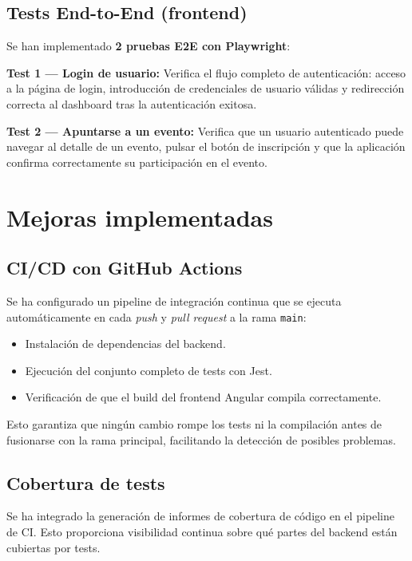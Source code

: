 \documentclass[12pt, a4paper]{article}
\begin{document}
\subsection{Tests End-to-End (frontend)}

Se han implementado \textbf{2 pruebas E2E con Playwright}:

\textbf{Test 1 — Login de usuario:}
Verifica el flujo completo de autenticación: acceso a la página de login, introducción
de credenciales de usuario válidas y redirección correcta al dashboard tras la
autenticación exitosa.

\textbf{Test 2 — Apuntarse a un evento:}
Verifica que un usuario autenticado puede navegar al detalle de un evento, pulsar el
botón de inscripción y que la aplicación confirma correctamente su participación en el evento.

\section{Mejoras implementadas}

\subsection{CI/CD con GitHub Actions}

Se ha configurado un pipeline de integración continua que se ejecuta automáticamente
en cada \textit{push} y \textit{pull request} a la rama \texttt{main}:

\begin{itemize}[leftmargin=1.4em]
  \item Instalación de dependencias del backend.
  \item Ejecución del conjunto completo de tests con Jest.
  \item Verificación de que el build del frontend Angular compila correctamente.
\end{itemize}

Esto garantiza que ningún cambio rompe los tests ni la compilación antes de fusionarse
con la rama principal, facilitando la detección de posibles problemas.

\subsection{Cobertura de tests}

Se ha integrado la generación de informes de cobertura de código en el pipeline de CI.
Esto proporciona visibilidad continua sobre qué partes del backend están cubiertas por
tests.
\end{document}
